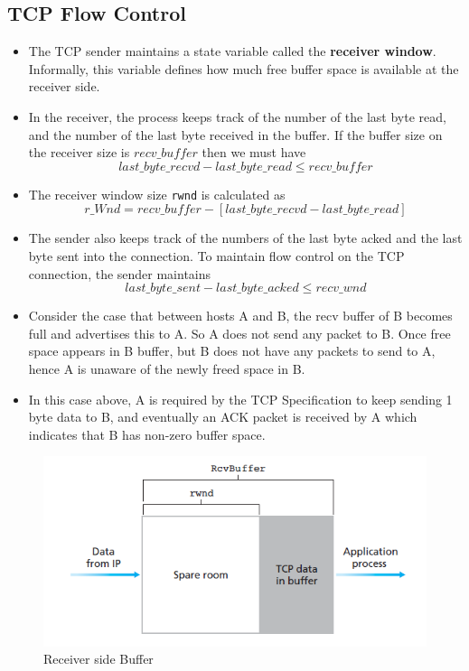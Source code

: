 \documentclass{article}
\theoremstyle{plain}
\theoremstyle{definition}
\begin{document}
\subsection{TCP Flow Control}
\begin{itemize}
    \item The TCP sender maintains a state variable called the \textbf{receiver window}. Informally, this variable defines how much free buffer space is available at the receiver side. 
    
    \item In the receiver, the process keeps track of the number of the last byte read, and the number of the last byte received in the buffer. If the buffer size on the receiver size is $recv\_buffer$  then we must have
    \begin{equation*}
        last\_byte\_recvd- last\_byte\_read \le recv\_buffer
    \end{equation*}
    
    \item The receiver window size \texttt{rwnd} is calculated as 
    \begin{equation*}
        r\_Wnd = recv\_buffer - [last\_byte\_recvd- last\_byte\_read]
    \end{equation*}
    
    \item The sender also keeps track of the numbers of the last byte acked and the last byte sent into the connection. To maintain flow control on the TCP connection, the sender maintains
    \begin{equation*}
        last\_byte\_sent - last\_byte\_acked \le recv\_wnd
    \end{equation*}
    
    \item Consider the case that between hosts A and B, the recv buffer of B becomes full and advertises this to A. So A does not send any packet to B. Once free space appears in B buffer, but B does not have any packets to send to A, hence A is unaware of the newly freed space in B. 
    
    \item In this case above, A is required by the TCP Specification to keep sending 1 byte data to B, and eventually an ACK packet is received by A which indicates that B has non-zero buffer space. 
\end{itemize}

\begin{figure}[!ht]
    \centering
    \includegraphics{cn5.png}
    \caption{Receiver side Buffer}
\end{figure}
\end{document}
